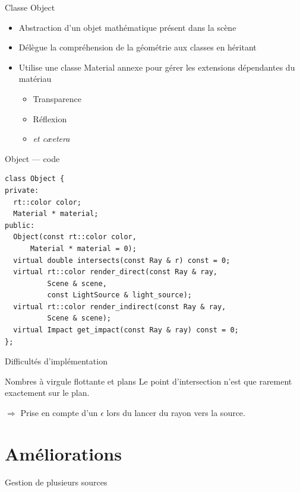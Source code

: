 \documentclass{beamer}
\begin{document}
\begin{frame}{Classe Object}
    \begin{itemize}
        \item Abstraction d'un objet mathématique présent dans la scène
        \item Délègue la compréhension de la géométrie aux classes en héritant
        \item Utilise une classe Material annexe pour gérer les extensions dépendantes du matériau
            \begin{itemize}
                \item Transparence
                \item Réflexion
                \item \emph{et cæetera}
            \end{itemize}
    \end{itemize}
\end{frame}

\begin{frame}[fragile]{Object — code}
    \begin{lstlisting}
class Object {
private:
  rt::color color;
  Material * material;
public:
  Object(const rt::color color,
      Material * material = 0);
  virtual double intersects(const Ray & r) const = 0;
  virtual rt::color render_direct(const Ray & ray,
          Scene & scene,
          const LightSource & light_source);
  virtual rt::color render_indirect(const Ray & ray,
          Scene & scene);
  virtual Impact get_impact(const Ray & ray) const = 0;
};
\end{lstlisting}
\end{frame}

\begin{frame}{Difficultés d'implémentation}
\begin{block}{Nombres à virgule flottante et plans}
    Le point d'intersection n'est que rarement exactement sur le plan.

    $\Rightarrow$ Prise en compte d'un $\epsilon$ lors du lancer du rayon vers la source.
\end{block}
\end{frame}

\section{Améliorations}
\begin{frame}{Gestion de plusieurs sources}

\end{frame}
\end{document}
